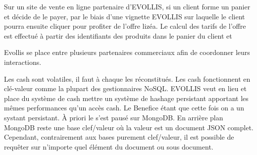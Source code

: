 Sur un site de vente en ligne partenaire d'EVOLLIS, si un client forme un panier et décide de le payer, par le biais d'une vignette EVOLLIS sur laquelle le client pourra ensuite cliquer pour profiter de l'offre \textsf{lizéa}. Le calcul des tarifs de l'offre est effectué  à partir des identifiants des produits dans le panier du client et    


Evollis se place entre plusieurs partenaires commerciaux afin de 
coordonner leurs interactions.


Les cash sont volatiles, il faut à chaque les réconstitués. Les cash
fonctionnent en clé-valeur comme la plupart des gestionnaires NoSQL.
EVOLLIS veut en lieu et place du système de cash mettre un système de
hashage persistant apportant les mêmes performances qu'un accès cash.
Le Benefice étant que cette fois on a un systant persistant. À priori
le s'est pausé sur MongoDB. En arrière plan MongoDB reste une base
clef/valeur où la valeur est un document JSON complet. Cependant,
contrairement aux bases purement clef/valeur, il est possible de
requêter sur n’importe quel élément du document ou sous document.
